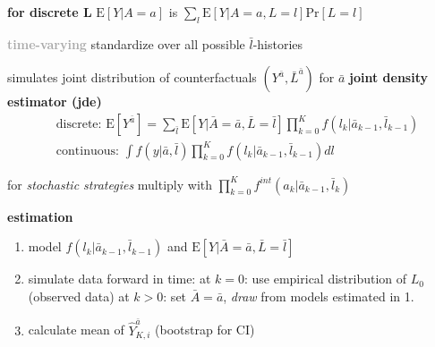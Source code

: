 \documentclass[8pt,twoside]{extarticle}
\begin{document}
\begin{multicols}{2}
 \textbf{for discrete $\boldsymbol{ L}$}  $\mathrm{E}\left[Y|A=a\right]$ is $\sum_l \mathrm{E}\left[Y|A=a,L=l\right]\mathrm{Pr}\left[L=l\right]$

\vspace{0.2em}
 \colorbox{lightgray!20!white}{\begin{minipage}{28em}

\textbf{\textcolor{darkgray}{time-varying}} standardize over all possible $\bar{l}$-histories



 simulates joint distribution of counterfactuals $\left(Y^{\bar{a}}, \bar{L}^{\bar{a}}\right)$ for $\bar{a}$
\textbf{joint density estimator (jde)}
\begin{align*}
& \text{discrete: } \mathrm{E}\left[Y^{\bar{a}}\right] = \sum_{\bar{l}} \mathrm{E}\left[Y|\bar{A}=\bar{a}, \bar{L}=\bar{l} \right] \prod_{k=0}^K f \left(l_k|\bar{a}_{k-1}, \bar{l}_{k-1}\right)  \\ &
\text{continuous: } \int f(y|\bar{a}, \bar{l}) \prod_{k=0}^K f\left(l_k|\bar{a}_{k-1}, \bar{l}_{k-1}\right)dl
\end{align*}

 for \textit{stochastic strategies} multiply with $\prod_{k=0}^K f^{int} \left(a_k|\bar{a}_{k-1}, \bar{l}_{k}\right) $

\end{minipage}}

 \colorbox{lightgray!20!white}{
\begin{minipage}{28em}


\begin{mdframed}[linecolor=black!20!,
    outerlinewidth=0.2pt,
    innertopmargin=0.5\baselineskip,
    innerbottommargin=0.5\baselineskip,
    backgroundcolor=lightgray!20!white, innerleftmargin=2pt, innerrightmargin=2pt]
\textbf{estimation} \citep{young2011comparative, schomaker_using_2019}

\begin{enumerate}[itemsep=0em, topsep=0pt, partopsep=0pt,parsep=0pt, leftmargin=1.5em]
\setlength{\itemsep}{0pt}%
\setlength{\parskip}{0pt}
\item model $f \left(l_k|\bar{a}_{k-1}, \bar{l}_{k-1}\right)$ and $\mathrm{E}\left[Y|\bar{A}=\bar{a}, \bar{L}=\bar{l} \right]$
\item simulate data forward in time: \newline
at $k=0$: use empirical distribution of $L_0$ (observed data) \newline
at $k>0$: set $\bar{A} = \bar{a}$, \textit{draw} from models estimated in 1.
\item calculate mean of $\hat{Y}_{K,i}^{\bar{a}}$ (bootstrap for CI)
\end{enumerate}


\end{mdframed}
\end{minipage}}
\end{multicols}
\end{document}
